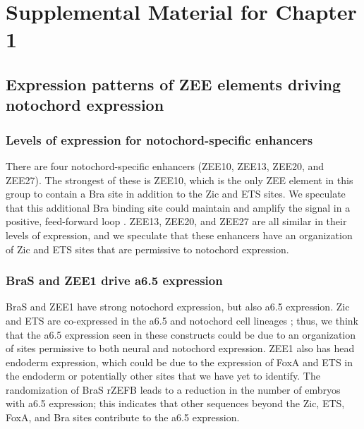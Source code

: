 \chapter{Supplemental Material for Chapter 1}

\section{Expression patterns of ZEE elements driving notochord expression}

\subsection{Levels of expression for notochord-specific enhancers}
There are four notochord-specific enhancers (ZEE10, ZEE13, ZEE20, and ZEE27). The strongest of these is ZEE10, which is the only ZEE element in this group to contain a Bra site in addition to the Zic and ETS sites. We speculate that this additional Bra binding site could maintain and amplify the signal in a positive, feed-forward loop \cite{reeves2017}. ZEE13, ZEE20, and ZEE27 are all similar in their levels of expression, and we speculate that these enhancers have an organization of Zic and ETS sites that are permissive to notochord expression. 

\subsection{BraS and ZEE1 drive a6.5 expression}
BraS and ZEE1 have strong notochord expression, but also a6.5 expression. Zic and ETS are co-expressed in the a6.5 and notochord cell lineages \cite{matsumoto2007a}; thus, we think that the a6.5 expression seen in these constructs could be due to an organization of sites permissive to both neural and notochord expression. ZEE1 also has head endoderm expression, which could be due to the expression of FoxA and ETS in the endoderm or potentially other sites that we have yet to identify. The randomization of BraS rZEFB leads to a reduction in the number of embryos with a6.5 expression; this indicates that other sequences beyond the Zic, ETS, FoxA, and Bra sites contribute to the a6.5 expression. 

